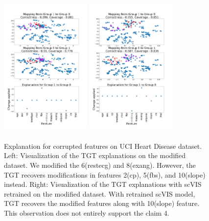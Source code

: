 \begin{figure}[H]
    \centering
    \includegraphics[width=0.4\textwidth, height=7.2cm]{../openreview/images/tffigures/heart-t2c.png}
    \includegraphics[width=0.4\textwidth, height=7.2cm]{../openreview/images/tffigures/heart-retrained-t2c.png}
    \caption{Explanation for corrupted features on UCI Heart Disease dataset. Left: Visualization of the TGT explanations on the modified dataset. We modified the 6(restecg) and 8(exang). However, the TGT recovers modifications in features 2(cp), 5(fbs), and 10(slope) instead. Right: Visualization of the TGT explanations with scVIS retrained on the modified dataset. With retrained scVIS model, TGT recovers the modified features along with 10(slope) feature. This observation does not entirely support the claim 4.}
    \label{fig:t2c-Heart}
\end{figure}
